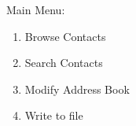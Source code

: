 \documentclass[11pt]{article}
\begin{document}
Main Menu: 
\begin{enumerate}
\setlength\itemsep{-2pt}
\item Browse Contacts
\item Search Contacts
\item Modify Address Book
\item Write to file
\end{enumerate}



%
%
%
%
%
%
\end{document}
